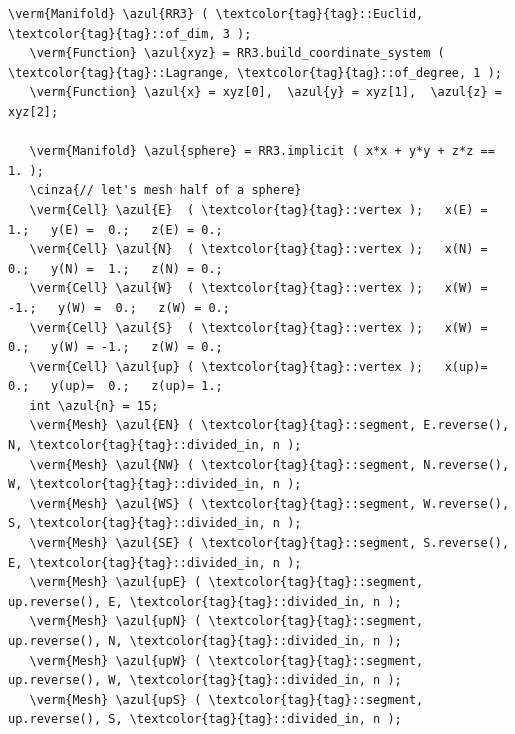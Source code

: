 \begin{Verbatim}[commandchars=\\\{\},formatcom=\small\tt,frame=single,
   label=parag-\ref{\numb section 2.\numb parag 6}.cpp,rulecolor=\color{coment},
   baselinestretch=0.94,framesep=2mm                                            ]
   \verm{Manifold} \azul{RR3} ( \textcolor{tag}{tag}::Euclid, \textcolor{tag}{tag}::of_dim, 3 );
   \verm{Function} \azul{xyz} = RR3.build_coordinate_system ( \textcolor{tag}{tag}::Lagrange, \textcolor{tag}{tag}::of_degree, 1 );
   \verm{Function} \azul{x} = xyz[0],  \azul{y} = xyz[1],  \azul{z} = xyz[2];

   \verm{Manifold} \azul{sphere} = RR3.implicit ( x*x + y*y + z*z == 1. );
   \cinza{// let's mesh half of a sphere}
   \verm{Cell} \azul{E}  ( \textcolor{tag}{tag}::vertex );   x(E) =  1.;   y(E) =  0.;   z(E) = 0.;
   \verm{Cell} \azul{N}  ( \textcolor{tag}{tag}::vertex );   x(N) =  0.;   y(N) =  1.;   z(N) = 0.;
   \verm{Cell} \azul{W}  ( \textcolor{tag}{tag}::vertex );   x(W) = -1.;   y(W) =  0.;   z(W) = 0.;
   \verm{Cell} \azul{S}  ( \textcolor{tag}{tag}::vertex );   x(W) =  0.;   y(W) = -1.;   z(W) = 0.;
   \verm{Cell} \azul{up} ( \textcolor{tag}{tag}::vertex );   x(up)=  0.;   y(up)=  0.;   z(up)= 1.;
   int \azul{n} = 15;
   \verm{Mesh} \azul{EN} ( \textcolor{tag}{tag}::segment, E.reverse(), N, \textcolor{tag}{tag}::divided_in, n );
   \verm{Mesh} \azul{NW} ( \textcolor{tag}{tag}::segment, N.reverse(), W, \textcolor{tag}{tag}::divided_in, n );
   \verm{Mesh} \azul{WS} ( \textcolor{tag}{tag}::segment, W.reverse(), S, \textcolor{tag}{tag}::divided_in, n );
   \verm{Mesh} \azul{SE} ( \textcolor{tag}{tag}::segment, S.reverse(), E, \textcolor{tag}{tag}::divided_in, n );
   \verm{Mesh} \azul{upE} ( \textcolor{tag}{tag}::segment, up.reverse(), E, \textcolor{tag}{tag}::divided_in, n );
   \verm{Mesh} \azul{upN} ( \textcolor{tag}{tag}::segment, up.reverse(), N, \textcolor{tag}{tag}::divided_in, n );
   \verm{Mesh} \azul{upW} ( \textcolor{tag}{tag}::segment, up.reverse(), W, \textcolor{tag}{tag}::divided_in, n );
   \verm{Mesh} \azul{upS} ( \textcolor{tag}{tag}::segment, up.reverse(), S, \textcolor{tag}{tag}::divided_in, n );
\end{Verbatim}

